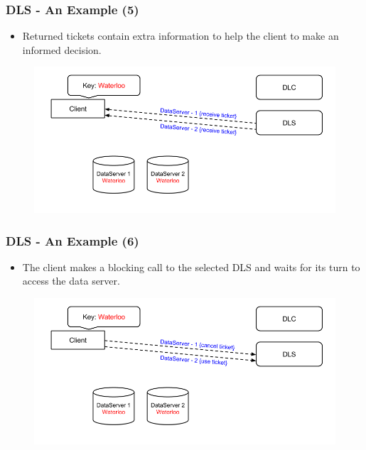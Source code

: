 \documentclass{beamer}
\begin{document}
\begin{frame}
  \frametitle{DLS - An Example (5)}
  \begin{itemize}
  \item Returned tickets contain extra information to help the client to make
    an informed decision.
  \end{itemize}
  \begin{figure}
    \begin{center}
      \centerline{\includegraphics[scale=0.40]{img/DLS_Example05.png}}
    \end{center}
  \end{figure}
\end{frame}

\begin{frame}
  \frametitle{DLS - An Example (6)}
  \begin{itemize}
  \item The client makes a blocking call to the selected DLS and waits for
    its turn to access the data server.
  \end{itemize}
  \begin{figure}
    \begin{center}
      \centerline{\includegraphics[scale=0.40]{img/DLS_Example06.png}}
    \end{center}
  \end{figure}
\end{frame}
\end{document}
